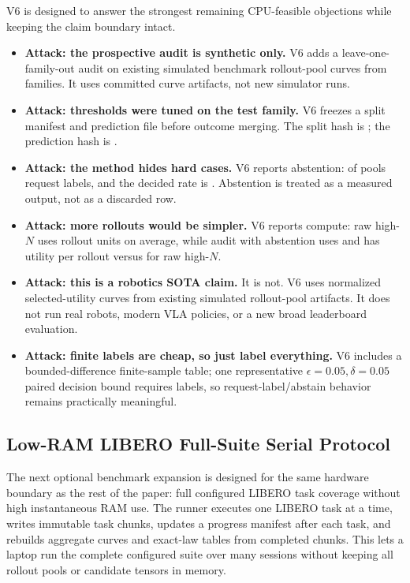 V6 is designed to answer the strongest remaining CPU-feasible objections while
keeping the claim boundary intact.
\begin{itemize}
  \item \textbf{Attack: the prospective audit is synthetic only.} V6 adds a
  leave-one-family-out audit on \VSixWAMPools{} existing simulated benchmark
  rollout-pool curves from \VSixWAMFamilies{} families. It uses committed curve
  artifacts, not new simulator runs.
  \item \textbf{Attack: thresholds were tuned on the test family.} V6 freezes a
  split manifest and prediction file before outcome merging. The split hash is
  \texttt{\VSixWAMSplitHash}; the prediction hash is
  \texttt{\VSixWAMPredictionHash}.
  \item \textbf{Attack: the method hides hard cases.} V6 reports abstention:
  \VSixWAMRequestLabelRate{} of pools request labels, and the decided rate is
  \VSixWAMDecidedRate{}. Abstention is treated as a measured output, not as a
  discarded row.
  \item \textbf{Attack: more rollouts would be simpler.} V6 reports compute:
  raw high-$N$ uses \VSixWAMRawRolloutUnits{} rollout units on average, while
  audit with abstention uses \VSixWAMAuditRolloutUnits{} and has utility per
  rollout \VSixWAMAuditUtilityPerRollout{} versus
  \VSixWAMRawUtilityPerRollout{} for raw high-$N$.
  \item \textbf{Attack: this is a robotics SOTA claim.} It is not. V6 uses
  normalized selected-utility curves from existing simulated rollout-pool
  artifacts. It does not run real robots, modern VLA policies, or a new broad
  leaderboard evaluation.
  \item \textbf{Attack: finite labels are cheap, so just label everything.} V6
  includes a bounded-difference finite-sample table; one representative
  $\epsilon=0.05,\delta=0.05$ paired decision bound requires
  \VSixWAMFiniteLabelsEpsFiveDeltaFive{} labels, so request-label/abstain
  behavior remains practically meaningful.
\end{itemize}

\subsection{Low-RAM LIBERO Full-Suite Serial Protocol}
\label{app:libero-full-suite-serial}

The next optional benchmark expansion is designed for the same hardware
boundary as the rest of the paper: full configured LIBERO task coverage without
high instantaneous RAM use. The runner
 executes one LIBERO
task at a time, writes immutable task chunks, updates a progress manifest after
each task, and rebuilds aggregate curves and exact-law tables from completed
chunks. This lets a laptop run the complete configured suite over many sessions
without keeping all rollout pools or candidate tensors in memory.

